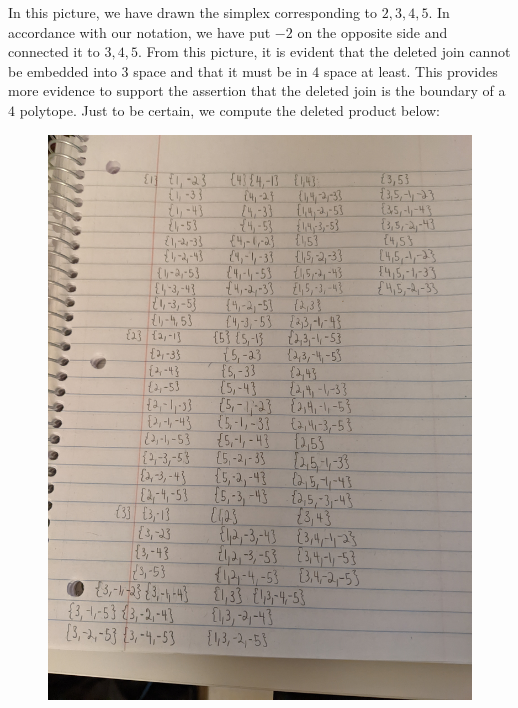 \documentclass[12pt]{article}
\begin{document}
In this picture, we have drawn the simplex corresponding to $2,3,4,5$. In accordance with our notation, we have put $-2$ on the opposite side and connected it to $3,4,5$. From this picture, it is evident that the deleted join cannot be embedded into $3$ space and that it must be in $4$ space at least. This provides more evidence to support the assertion that the deleted join is the boundary of a $4$ polytope. Just to be certain, we compute the deleted product below:
\begin{figure}[H]
\centering
\includegraphics[width=\textwidth]{Image2}
\end{figure}
\newpage
\end{document}
